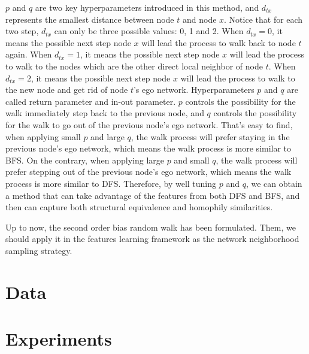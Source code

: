 \documentclass[sigconf]{acmart}
\begin{document}
$p$ and $q$ are two key hyperparameters introduced in this method, and $d_{tx}$ represents the smallest distance between node $t$ and node $x$. Notice that for each two step, $d_{tx}$ can only be three possible values: 0, 1 and 2. When $d_{tx}=0$, it means the possible next step node $x$ will lead the process to walk back to node $t$ again. When $d_{tx}=1$, it means the possible next step node $x$ will lead the process to walk to the nodes which are the other direct local neighbor of node $t$. When $d_{tx}=2$, it means the possible next step node $x$ will lead the process to walk to the new node and get rid of node $t$'s ego network. Hyperparameters $p$ and $q$ are called return parameter and in-out parameter. $p$ controls the possibility for the walk immediately step back to the previous node, and $q$ controls the possibility for the walk to go out of the previous node's ego network. That's easy to find, when applying small $p$ and large $q$, the walk process will prefer staying in the previous node's ego network, which means the walk process is more similar to BFS. On the contrary, when applying large $p$ and small $q$, the walk process will prefer stepping out of the previous node's ego network, which means the walk process is more similar to DFS. Therefore, by well tuning $p$ and $q$, we can obtain a method that can take advantage of the features from both DFS and BFS, and then can capture both structural equivalence and homophily similarities.

Up to now, the second order bias random walk has been formulated. Them, we should apply it in the features learning framework as the network neighborhood sampling strategy.

\section{Data}


\section{Experiments}
\end{document}
